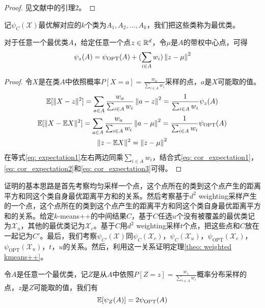 \begin{proof}
    见文献\cite{Dasgupta_kmeans}中的引理2。
\end{proof}
记$\psi_{C}(\mathcal{X})$最优解对应的$k$个类为$A_1,A_2,...,A_k$，我们把这些类称为最优类。
\begin{corollary}
    \label{cor: expectation}
    对于任意一个最优类$A$，给定任意一个点$z \in \mathbb{R}^d$，令$\mu$是$A$的带权中心点，可得
    \begin{equation*}
        \psi_z(A) = \psi_{\text{OPT}}(A) + (\sum_{i \in A}w_i) \left\lVert z-\mu\right\rVert^2
    \end{equation*}
\end{corollary}
\begin{proof}
    令$X$是在类$A$中依照概率$P[X=a] = \frac{w_a}{\sum_{i \in A} w_i}$采样的点，$a$是$X$可能取的值。
    \begin{gather}
        \mathbb{E}[\|X-z\|^{2}] = \sum_{a \in A} \frac{w_a}{\sum_{i \in A} w_i} \left\lVert a-z\right\rVert^2 = \frac{1}{\sum_{i \in A} w_i} \psi_z(A) \label{eq: cor_expectation1} \\
        \mathbb{E}[\|X-\mathbb{E} X\|^{2}] = \sum_{a \in A} \frac{w_a}{\sum_{i \in A} w_i} \left\lVert a-\mu\right\rVert^2 = \frac{1}{\sum_{i \in A} w_i} \psi_{\text{OPT}}(A) \label{eq: cor_expectation2}\\
        \|z-\mathbb{E} X\|^{2} = \left\lVert z-\mu\right\rVert^2 \label{eq: cor_expectation3}
    \end{gather}
    在等式\ref{eq: expectation1}左右两边同乘$\sum_{i \in A} w_i$，结合式\ref{eq: cor_expectation1}，\ref{eq: cor_expectation2}和\ref{eq: cor_expectation3}可得。
\end{proof}
证明的基本思路是首先考察均匀采样一个点，这个点所在的类到这个点产生的距离平方和同这个类自身最优距离平方和的关系。然后考察基于$d^2$ weighting采样产生的一个点，这个点所在的类到这个点产生的距离平方和同这个类自身最优距离平方和的关系。给定$k$-means++的中间结果$C$，基于$C$任选$u$个没有被覆盖的最优类记为$\mathcal{X}_u$，其他的最优类记为$\mathcal{X}_c$。基于$C$用$d^2$ weighting采样$t$个点，把这些点和$C$放在一起记为$C'$。最后，我们考察$\psi_{C'}(\mathcal{X})$同$\psi_{C}(\mathcal{X}_c)$，$\psi_{C}(\mathcal{X}_u)$，$\psi_{\text{OPT}}(\mathcal{X}_c)$，$\psi_{\text{OPT}}(\mathcal{X}_u)$，$t$，$u$的关系。然后，利用这一关系证明定理\ref{theo: weighted kmeans++}。
\begin{lemma}
    \label{lem: 2OPT_A}
    令$A$是任意一个最优类，记$Z$是从$A$中依照$P[Z = z] = \frac{w_z}{\sum_{i \in A} w_i}$概率分布采样的点，$z$是$Z$可能取的值，我们有
    \begin{equation*}
        \mathbb{E}[\psi_Z(A)] = 2 \psi_{\text{OPT}}(A)
    \end{equation*}
\end{lemma}

